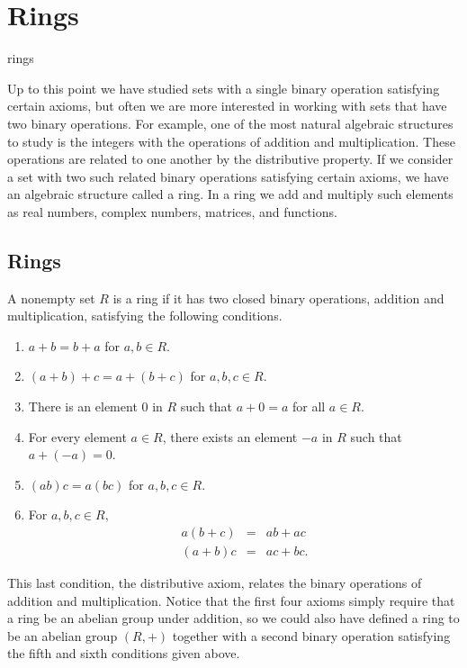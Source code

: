 \chapter{Rings}{rings}
 
Up to this point we have studied sets with a single binary operation
satisfying certain axioms, but often we are more interested in working
with sets that have two binary operations.  For example, one of the
most natural algebraic structures to study is the integers 
with the operations of addition and multiplication. These operations
are related to one another by the distributive
property. If we consider a set with two such related binary operations
satisfying certain axioms, we have an algebraic structure called a
ring. In a ring we add and multiply such elements as real numbers,
complex numbers, matrices, and functions. 
 

\section{Rings}

A nonempty set $R$ is a {\bfi ring\/} if
it has two closed binary operations, addition and multiplication,
satisfying the following conditions.  
\begin{enumerate}
 
\item
$a + b = b + a$ for $a, b \in R$.
 
\item
$(a + b) + c = a + ( b + c)$ for $a, b, c  \in R$.
 
\item
There is an element $0$ in $R$ such that $a + 0 = a$ for all $a \in
R$. 
 
\item
For every element $a \in R$, there exists an element $-a$ in $R$ such
that $a + (-a) = 0$. 
 
\item
$(ab)  c = a  ( b  c)$ for $a, b, c  \in R$.
 
\item
For $a, b, c \in R$,
\begin{eqnarray*}
a( b + c)&  = & ab +ac \\
(a + b)c & = & ac + bc.
\end{eqnarray*}
 
\end{enumerate}
This last condition, the distributive axiom, relates the binary
operations of addition and multiplication. Notice that the first four
axioms simply require that a ring be an abelian group under addition,
so we could also have defined a ring to be an abelian group
$(R, +)$ together with a second binary operation satisfying the fifth
and sixth conditions given above.  
 
